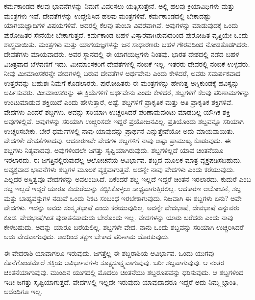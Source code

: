 ಕರ್ಮಕಾಂಡದ ಕೆಲವು ಭಾವನೆಗಳನ್ನು ನಿಮಗೆ ವಿವರಿಸಲು ಯತ್ನಿಸುತ್ತೇನೆ. ಅಲ್ಲಿ ಹಲವು ಕ್ರಿಯಾವಿಧಿಗಳು ಮತ್ತು ಮಂತ್ರಗಳು ಇವೆ. ದೇವತೆಗಳನ್ನು ಉದ್ದೇಶಿಸಿದ ಹಲವು ಮಂತ್ರಗಳಿವೆ. ಕರ್ಮಕಾಂಡದಲ್ಲಿ ಬೇಕಾದಷ್ಟು ಯಾಗಯಜ್ಞಾದಿಗಳ ವಿಷಯಗಳಿವೆ. ಅದರಲ್ಲಿ ಕೆಲವು ತುಂಬಾ ವಿವರವಾಗಿವೆ. ಅವುಗಳನ್ನು ಮಾಡುವುದಕ್ಕೆ ಒಂದು ಪುರೋಹಿತರ ಸೇನೆಯೇ ಬೇಕಾಗುತ್ತದೆ. ಕರ್ಮಕಾಂಡ ಬಹಳ ವಿಸ್ತಾರವಾಗಿರುವುದರಿಂದ ಪುರೋಹಿತ ವೃತ್ತಿಯೇ ಒಂದು ಶಾಸ್ತ್ರವಾಯಿತು. ಮಂತ್ರಗಳು ಮತ್ತು ಯಾಗಯಜ್ಞಗಳನ್ನು ಜನ ಸಾಧಾರಣರು ಬಹಳ ಗೌರವದಿಂದ ನೋಡತೊಡಗಿದರು. ದೇವತೆಗಳು ಮಾಯವಾದರು. ಅವರ ಸ್ಥಾನದಲ್ಲಿ ಈ ಯಾಗಯಜ್ಞಗಳು ನಿಂತವು. ಭಾರತ ದೇಶದಲ್ಲಿ ನಡೆದ ಬಹಳ ವಿಚಿತ್ರವಾದ ಬೆಳವಣಿಗೆ ಇದು. ಮೀಮಾಂಸಕರಿಗೆ ದೇವತೆಗಳಲ್ಲಿ ನಂಬಿಕೆ ಇಲ್ಲ. ಇತರರು ದೇವರಲ್ಲಿ ನಂಬಿಕೆ ಉಳ್ಳವರು. ನೀವು ಮೀಮಾಂಸಕರನ್ನೇ ವೇದಗಳಲ್ಲಿ ಬರುವ ದೇವತೆಗಳ ಅರ್ಥವೇನು ಎಂದು ಕೇಳಿದರೆ, ಅವರು ಸಮರ್ಪಕವಾದ ಉತ್ತರವನ್ನು ಬಹುಶಃ ನಿಮಗೆ ಕೊಡಲಾರರು. ಪುರೋಹಿತರು ಈ ಮಂತ್ರಗಳನ್ನು ಹೇಳುತ್ತ ಅಗ್ನಿಕುಂಡಕ್ಕೆ ಹವಿಸ್ಸನ್ನು ಅರ್ಪಿಸು\-ವರು. ಮೀಮಾಂಸಕರನ್ನು ಈ ಕ್ರಿಯೆಗಳಿಗೆ ಅರ್ಥವೇನು ಎಂದು ಕೇಳಿದರೆ, ಶಬ್ದಗಳಿಗೆ ಕೆಲವು ಪರಿಣಾಮಗಳನ್ನು ಉಂಟುಮಾಡುವ ಶಕ್ತಿಯಿದೆ ಎಂದು ಹೇಳುತ್ತಾರೆ, ಅಷ್ಟೆ. ಶಬ್ದಗಳಿಗೆ ಪ್ರಾಕೃತಿಕ ಮತ್ತು ಅತಿ ಪ್ರಾಕೃತಿಕ ಶಕ್ತಿಗಳಿವೆ. ವೇದಗಳು ಎಂದರೆ ಶಬ್ದಗಳು. ಅವನ್ನು ಸರಿಯಾಗಿ ಉಚ್ಚರಿಸಿದರೆ ಪರಿಣಾಮವುಂಟು ಮಾಡಬಲ್ಲ ಯೌಗಿಕ ಶಕ್ತಿ ಅವುಗಳಲ್ಲಿವೆ. ಅವುಗಳನ್ನು ಸರಿಯಾಗಿ ಉಚ್ಚರಿಸದೇ ಇದ್ದರೆ ಪ್ರಯೋಜನವಿಲ್ಲ. ಪ್ರತಿಯೊಂದು ಶಬ್ದವನ್ನೂ ಸರಿಯಾಗಿ ಉಚ್ಚರಿಸಬೇಕು. ಬೇರೆ ಧರ್ಮಗಳಲ್ಲಿ ನಾವು ಯಾವುದನ್ನು ಪ್ರಾರ್ಥನೆ ಎನ್ನುತ್ತೇವೆಯೋ ಅದು ಮಾಯವಾಯಿತು. ವೇದಗಳೇ ದೇವತೆಗಳಾದವು. ಆದಕಾರಣವೇ ವೇದಗಳ ಶಬ್ದಗಳಿಗೆ ನಾವು ಅಷ್ಟು ಪ್ರಾಮುಖ್ಯ ಕೊಡುವುದು. ಈ ಶಬ್ದಗಳು ನಿತ್ಯವಾದವು. ಅವುಗಳಿಂದಲೇ ಜಗತ್ತು ಸೃಷ್ಟಿಯಾಗಿರುವುದು. ಶಬ್ದಗಳಿಲ್ಲದೆ ಯಾವ ಚಿಂತನೆಯೂ ಇರಲಾರದು. ಈ ಜಗತ್ತಿನಲ್ಲಿರುವುದೆಲ್ಲ ಆಲೋಚನೆಯ ಆವಿರ್ಭಾವ. ಶಬ್ದದ ಮೂಲಕ ಮಾತ್ರ ವ್ಯಕ್ತಪಡಿಸಬಹುದು. ಅವ್ಯಕ್ತವಾದ ಭಾವನೆಗಳು ಶಬ್ದಗಳ ಮೂಲಕ ವ್ಯಕ್ತವಾಗುತ್ತವೆ. ಅದನ್ನೇ ನಾವು ವೇದಗಳು ಎಂದು ಕರೆಯುವುದು. ಎಲ್ಲದರ ಅಸ್ತಿತ್ವವೂ ವೇದಗಳನ್ನು ಅವಲಂಬಿಸಿದೆ. ಏಕೆಂದರೆ ಶಬ್ದ ಇಲ್ಲದೆ ಇದ್ದರೆ ಚಿಂತನೆ ಇರಲಾರದು. ಕುದುರೆ ಎಂಬ ಶಬ್ದ ಇಲ್ಲದೆ ಇದ್ದರೆ ಯಾರೂ ಕುದುರೆಯನ್ನು ಕಲ್ಪಿಸಿಕೊಳ್ಳಲು ಸಾಧ್ಯವಾಗುತ್ತಿರಲಿಲ್ಲ. ಆದಕಾರಣ ಆಲೋಚನೆ, ಶಬ್ದ ಮತ್ತು ಬಾಹ್ಯವಸ್ತುಗಳ ನಡುವೆ ಒಂದು ನಿಕಟ ಸಂಬಂಧ ಇರಬೇಕಾಗುವುದು. ನಿಜವಾಗಿ ಈ ಶಬ್ದಗಳು ಏನು? ಅವೇ ವೇದಗಳು. ಇದನ್ನು ಅವರು ಸಂಸ್ಕೃತಭಾಷೆ ಎಂದು ಕರೆಯುವುದಿಲ್ಲ. ಅದನ್ನೇ ವೇದಭಾಷೆ, ದೇವಭಾಷೆ ಎನ್ನುವರು ಕೂಡ. ವೇದಭಾಷೆಗಿಂತ ಪುರಾತನವಾದುದು ಬೇರೊಂದು ಇಲ್ಲ. ವೇದಗಳನ್ನು ಯಾರು ಬರೆದರು ಎಂದು ನಾವು ಕೇಳಬಹುದು. ಅದನ್ನು ಯಾರೂ ಬರೆಯಲಿಲ್ಲ. ಶಬ್ದಗಳೇ ವೇದ. ನಾನು ಒಂದು ಶಬ್ದವನ್ನು ಸರಿಯಾಗಿ ಉಚ್ಚರಿಸಿದರೆ ಅದು ವೇದವಾಗುವುದು. ಅದರಿಂದ ತಕ್ಷಣ ಬೇಕಾದ ಪರಿಣಾಮ ದೊರಕುವುದು.

ಈ ವೇದರಾಶಿ ಯಾವಾಗಲೂ ಇರುವುದು. ಜಗತ್ತೆಲ್ಲ ಈ ಶಬ್ದರಾಶಿಯ ಆವಿರ್ಭಾವ. ಒಂದು ಯುಗವು ಕೊನೆಗೊಂಡಮೇಲೆ ಶಕ್ತಿಯ ಆವಿರ್ಭಾವಗಳು ಸೂಕ್ಷ್ಮಸೂಕ್ಷ್ಮವಾಗುವುವು. ಬರೀ ಶಬ್ದವಾಗುವುವು. ಆ ನಂತರ ಚಿಂತನೆಯಾಗುವುವು. ಮುಂದಿನ ಯುಗದಲ್ಲಿ ಮೊದಲು ಚಿಂತನೆಯು ಶಬ್ದರೂಪವನ್ನು ಧರಿಸುವುದು. ಆ ಶಬ್ದಗಳಿಂದ ಇಡೀ ಜಗತ್ತು ಸೃಷ್ಟಿಯಾಗುತ್ತದೆ. ವೇದಗಳಲ್ಲಿ ಇಲ್ಲದೇ ಇರುವುದು ಯಾವುದಾದರೂ ಇದ್ದರೆ ಅದು ನಿಮ್ಮ ಭ್ರಾಂತಿ, ಅದೆಂದಿಗೂ ಇಲ್ಲ.

